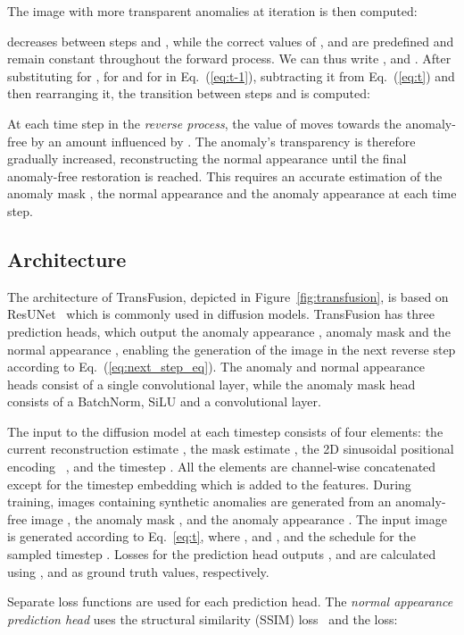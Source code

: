 \documentclass[10pt,twocolumn,letterpaper]{article}
\begin{document}
The image with more transparent anomalies  at iteration  is then computed:

 decreases between steps  and , while the correct values of ,  and  are predefined and remain constant throughout the forward process. We can thus write ,  and . After substituting  for ,  for  and  for  in Eq.~(\ref{eq:t-1}), subtracting it from Eq.~(\ref{eq:t}) and then rearranging it, the transition between steps  and  is computed:

At each time step in the \textit{reverse process}, the value of  moves towards the anomaly-free  by an amount influenced by . The anomaly's transparency is therefore gradually increased, reconstructing the normal appearance until the final anomaly-free restoration  is reached. This requires an accurate estimation of the anomaly mask , the normal appearance  and the anomaly appearance  at each time step.


\subsection{Architecture}
\label{ch:multihead}


The architecture of TransFusion, depicted in Figure~\ref{fig:transfusion}, is based on ResUNet~\cite{resunet} which is commonly used in diffusion models. TransFusion has three prediction heads, which output the anomaly appearance , anomaly mask  and the normal appearance , enabling the generation of the image in the next reverse step according to Eq.~(\ref{eq:next_step_eq}). The anomaly and normal appearance heads consist of a single convolutional layer, while the anomaly mask head consists of a BatchNorm, SiLU and a convolutional layer. 

The input to the diffusion model at each timestep consists of four elements: the current reconstruction estimate , the mask estimate , the 2D sinusoidal positional encoding ~\cite{positional_encoding}, and the timestep . All the elements are channel-wise concatenated except for the timestep embedding which is added to the features. During training, images containing synthetic anomalies are generated from an anomaly-free image , the anomaly mask , and the anomaly appearance . The input image  is generated according to Eq.~\ref{eq:t}, where ,  and , and the  schedule for the sampled timestep . Losses for the prediction head outputs ,  and  are calculated using ,  and  as ground truth values, respectively. 


Separate loss functions are used for each prediction head. The \textit{normal appearance prediction head} uses the structural similarity (SSIM) loss~\cite{ssim} and the  loss:
\end{document}
